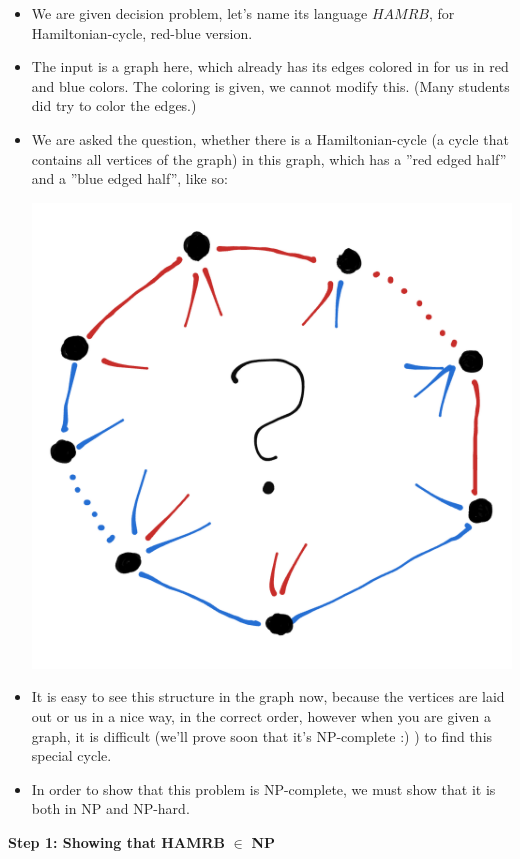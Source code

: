 \begin{itemize}
\item We are given decision problem, let's name its language $HAMRB$, for Hamiltonian-cycle, red-blue version.
\item The input is a graph here, which already has its edges colored in for us in red and blue colors. The coloring is given, we cannot modify this. (Many students did try to color the edges.)
\item We are asked the question, whether there is a Hamiltonian-cycle (a cycle that contains all vertices of the graph) in this graph, which has a ''red edged half'' and a ''blue edged half'', like so:

\begin{center}
\includegraphics[width=0.7\linewidth]{./exams/2022_05_30/03/hamrb.png}
\end{center}

\item It is easy to see this structure in the graph now, because the vertices are laid out or us in a nice way, in the correct order, however when you are given a graph, it is difficult (we'll prove soon that it's NP-complete :) ) to find this special cycle.
\item In order to show that this problem is NP-complete, we must show that it is both in NP and NP-hard.
\end{itemize}

\textbf{Step 1: Showing that HAMRB }$\mathbf{\in{}}$\textbf{ NP}

